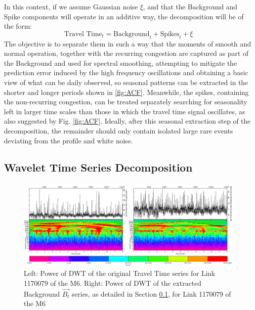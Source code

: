 \documentclass[letterpaper, 10 pt, conference]{ieeeconf}  %
\begin{document}
In this context, if we assume Gaussian noise $\xi$, and that the Background and Spike components will operate in an additive way, the decomposition will be of the form:
\begin{equation}
\textrm{Travel Time}_t  = \textrm{Background}_t + \textrm{Spikes}_t + \xi
\end{equation}
The objective is to separate them in such a way that the moments of smooth and normal operation, together with the recurring congestion are captured as part of the Background and used for spectral smoothing, attempting to mitigate the prediction error induced by the high frequency oscillations and obtaining a basic view of what can be daily observed, so seasonal patterns can be extracted in the shorter and longer periods shown in \ref{fig:ACF}.
Meanwhile, the spikes, containing the non-recurring congestion, can be treated separately searching for seasonality left in larger time scales than those in which the travel time signal oscillates, as also suggested by Fig. \ref{fig:ACF}. 
Ideally, after this seasonal extraction step of the decomposition, the remainder should only contain isolated large rare events deviating from the profile and white noise.
\subsection{Wavelet Time Series Decomposition}\label{decomposition}
\begin{figure}[htbp]
	\centerline{\includegraphics[width=\linewidth]{./images/WT_combined_1500_600.png}}
	\caption{Left: Power of DWT of the original Travel Time series for Link 1170079 of the M6.
	Right: Power of DWT of the extracted Background $\vec{B_t}$ series, as detailed in Section \ref{decomposition}, for Link 1170079 of the M6}
	\label{fig:wt}
\end{figure}
\end{document}
